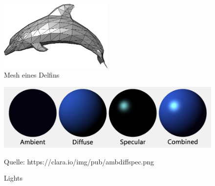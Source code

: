 \begin{figure}
	\begin{center}
		\includegraphics[width=0.5\textwidth]{06anhang/bilder/delphin.jpg}
		\caption{Mesh eines Delfins}
		\label{Dolphin}
	\end{center}
\end{figure}
\begin{figure}
	\centering
	\includegraphics[scale=0.4]{02theorie/amb_diff_spec.png}
		
	Quelle: https://clara.io/img/pub/amb\textunderscore diff\textunderscore spec.png
	\caption{Lights}\label{Img:Lights}
\end{figure}